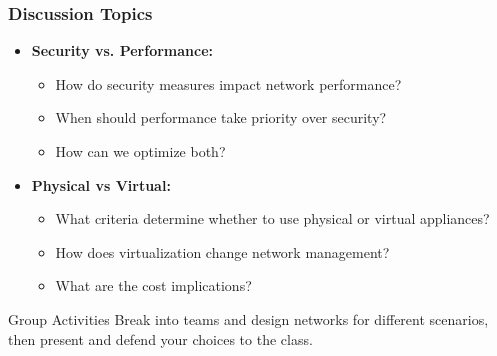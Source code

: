 \documentclass{beamer}
\begin{document}
\begin{frame}
    \frametitle{Discussion Topics}
    
    \begin{itemize}
        \item \textbf{Security vs. Performance:}
        \begin{itemize}
            \item How do security measures impact network performance?
            \item When should performance take priority over security?
            \item How can we optimize both?
        \end{itemize}
        
        \item \textbf{Physical vs Virtual:}
        \begin{itemize}
            \item What criteria determine whether to use physical or virtual appliances?
            \item How does virtualization change network management?
            \item What are the cost implications?
        \end{itemize}
    \end{itemize}
    
    \begin{block}{Group Activities}
        Break into teams and design networks for different scenarios, then present and defend your choices to the class.
    \end{block}
\end{frame}
\end{document}
